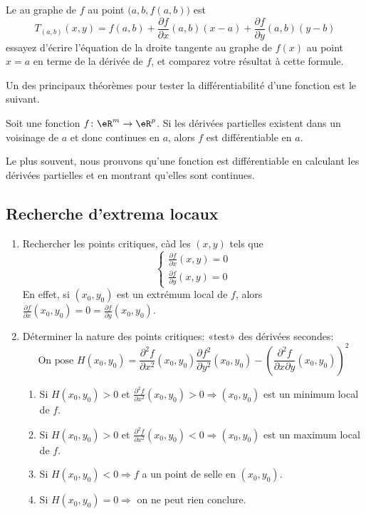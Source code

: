 Le  au graphe de $f$ au point $\big(a,b,f(a,b)\big)$ est 
\begin{equation}
	T_{(a,b)}(x,y) = f(a,b) + \frac{\partial f}{\partial x}(a,b) (x-a) + \frac{\partial f}{\partial y}(a,b) (y-b)
\end{equation}
essayez d'écrire l'équation de la droite tangente au graphe de $f(x)$ au point $x=a$ en terme de la dérivée de $f$, et comparez votre résultat à cette formule.

Un des principaux théorèmes pour tester la différentiabilité d'une fonction est le suivant.

\begin{theorem}		\label{ThoProuverDiffable}
	Soit une fonction $f\colon \eR^m\to \eR^p$. Si les dérivées partielles existent dans un voisinage de $a$ et donc continues en $a$, alors $f$ est différentiable en $a$.
\end{theorem}
Le plus souvent, nous prouvons qu'une fonction est différentiable en calculant les dérivées partielles et en montrant qu'elles sont continues.

\subsection{Recherche d'extrema locaux}

\begin{enumerate}
\item Rechercher les points critiques, càd les $(x,y)$ tels que
\[\begin{cases} \frac{\partial f}{\partial x}(x,y) = 0 \\ \frac{\partial f}{\partial y}(x,y) = 0 \end{cases} \]
En effet, si $(x_0,y_0)$ est un extrémum local de $f$, alors $\frac{\partial f}{\partial x}(x_0,y_0) = 0 = \frac{\partial f}{\partial y}(x_0,y_0)$.
\item Déterminer la nature des points critiques: «test» des dérivées secondes:
\[\text{On pose }H(x_0,y_0) = \frac{\partial^2 f}{\partial x^2}(x_0,y_0)\frac{\partial f^2}{\partial y^2}(x_0,y_0) - \left(\frac{\partial^2 f}{\partial x\partial y}(x_0,y_0)\right)^2\]
\begin{enumerate}
\item Si $H(x_0,y_0) > 0$ et $\frac{\partial^2 f}{\partial x^2}(x_0,y_0) > 0 \Longrightarrow (x_0,y_0)$ est un minimum local de $f$.
\item Si $H(x_0,y_0) > 0$ et $\frac{\partial^2 f}{\partial x^2}(x_0,y_0) < 0 \Longrightarrow (x_0,y_0)$ est un maximum local de $f$.
\item Si $H(x_0,y_0) < 0 \Longrightarrow f$ a un point de selle en $(x_0,y_0)$.
\item Si $H(x_0,y_0) = 0 \Longrightarrow$ on ne peut rien conclure.
\end{enumerate}
\end{enumerate}

